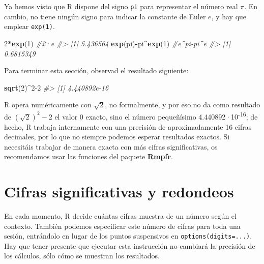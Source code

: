 \documentclass[
]{book}
\newenvironment{Shaded}{\begin{snugshade}}{\end{snugshade}}
\newcommand{\CommentTok}[1]{\textcolor[rgb]{0.56,0.35,0.01}{\textit{#1}}}
\newcommand{\DecValTok}[1]{\textcolor[rgb]{0.00,0.00,0.81}{#1}}
\newcommand{\KeywordTok}[1]{\textcolor[rgb]{0.13,0.29,0.53}{\textbf{#1}}}
\newcommand{\NormalTok}[1]{#1}
\newcommand{\OperatorTok}[1]{\textcolor[rgb]{0.81,0.36,0.00}{\textbf{#1}}}
\theoremstyle{definition}
\theoremstyle{definition}
\theoremstyle{definition}
\theoremstyle{remark}
\begin{document}
Ya hemos visto que R dispone del signo \texttt{pi} para representar el número real \(\pi\). En cambio,
no tiene ningún signo para indicar la constante de Euler \(e\), y hay que emplear \texttt{exp(1)}.

\begin{Shaded}
\begin{Highlighting}[]
\DecValTok{2}\OperatorTok{*}\KeywordTok{exp}\NormalTok{(}\DecValTok{1}\NormalTok{) }\CommentTok{\#2·e}
\CommentTok{\#\textgreater{} [1] 5.436564}
\KeywordTok{exp}\NormalTok{(pi)}\OperatorTok{{-}}\NormalTok{pi}\OperatorTok{\^{}}\KeywordTok{exp}\NormalTok{(}\DecValTok{1}\NormalTok{) }\CommentTok{\#e\^{}pi{-}pi\^{}e}
\CommentTok{\#\textgreater{} [1] 0.6815349}
\end{Highlighting}
\end{Shaded}

Para terminar esta sección, observad el resultado siguiente:

\begin{Shaded}
\begin{Highlighting}[]
\KeywordTok{sqrt}\NormalTok{(}\DecValTok{2}\NormalTok{)}\OperatorTok{\^{}}\DecValTok{2{-}2}
\CommentTok{\#\textgreater{} [1] 4.440892e{-}16}
\end{Highlighting}
\end{Shaded}

R opera numéricamente con \(\sqrt{2}\), no formalmente,
y por eso no da como resultado de \((\sqrt{2})^2-2\) el valor 0 exacto, sino
el número pequeñísimo 4.440892·10\textsuperscript{-16}; de hecho, R trabaja internamente con una precisión de aproximadamente 16 cifras decimales, por lo que no siempre podemos esperar resultados exactos. Si necesitáis trabajar de manera exacta con más cifras significativas, os recomendamos usar las funciones del paquete \textbf{Rmpfr}.

\hypertarget{cifras-significativas-y-redondeos}{%
\section{Cifras significativas y redondeos}\label{cifras-significativas-y-redondeos}}

En cada momento, R decide cuántas cifras muestra de un número según el contexto. También podemos especificar este número de cifras para toda una sesión, entrándolo en lugar de los puntos suspensivos en \texttt{options(digits=...)}. Hay que tener presente que ejecutar esta instrucción no cambiará la precisión de los cálculos, sólo cómo se muestran los resultados.
\end{document}
